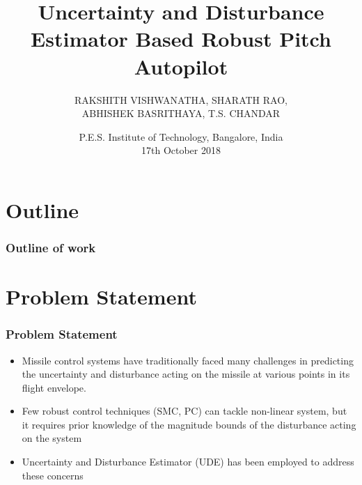 \documentclass[table,10pt,red]{beamer}	%
\title
[
Uncertainty and Disturbance Estimator Based Robust Pitch Autopilot	%
]
{
	Uncertainty and Disturbance Estimator Based Robust Pitch Autopilot
}
\author
[
]
{
	RAKSHITH VISHWANATHA, SHARATH RAO, \\ABHISHEK BASRITHAYA, T.S. CHANDAR \\
}
\date
{
P.E.S. Institute of Technology, Bangalore, India \\ 17th October 2018	%
}
\begin{document}

\begin{frame}	%
	\titlepage %
\end{frame}
\section*{Outline}
\begin{frame}
	\frametitle{Outline of work} %
	\tableofcontents %
\end{frame}

\section{Problem Statement} 
\begin{frame}
\frametitle{Problem Statement}
\begin{itemize}  %
	\item Missile control systems have traditionally faced many challenges in predicting the uncertainty and disturbance acting on the missile at various points in its flight envelope. %
	\medskip
	\item Few robust control techniques (SMC, PC) can tackle non-linear system, but it requires prior knowledge of the magnitude bounds of the disturbance acting on the system %
	\medskip
	\item Uncertainty and Disturbance Estimator (UDE) has been employed to address these concerns
\end{itemize}
\end{frame}
\end{document}
